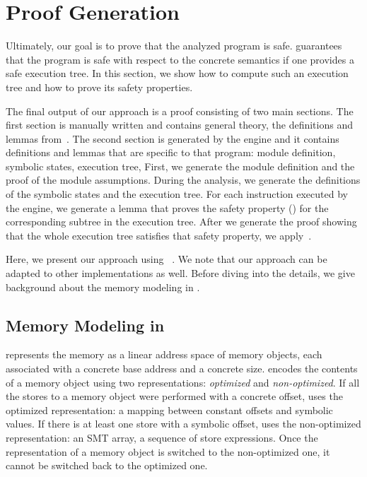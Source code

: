 \section{Proof Generation}
\label{sec:proof-generation}

Ultimately, our goal is to prove that the analyzed program is safe.
 guarantees that the program is safe with respect to the concrete semantics if one provides a safe execution tree.
In this section, we show how to compute such an execution tree and how to prove its safety properties.

The final output of our approach is a \coq proof consisting of two main sections.
%
The first section is manually written and contains general theory,
\ie the definitions and lemmas from~.
%
The second section is generated by the \SE engine and it contains definitions and lemmas that are specific to that program:
module definition, symbolic states, execution tree, \etc
First, we generate the module definition and the proof of the module assumptions.
During the analysis,
we generate the definitions of the symbolic states and the execution tree.
For each instruction executed by the \SE engine,
we generate a lemma that proves the safety property () for the corresponding subtree in the execution tree.
After we generate the proof showing that the whole execution tree satisfies that safety property, we apply~.

Here, we present our approach using \klee~\cite{klee}. %
We note that our approach can be adapted to other \SE implementations as well.
Before diving into the details,
we give background about the memory modeling in \klee.

\subsection{Memory Modeling in \klee}

\klee represents the memory as a linear address space of memory objects,
each associated with a concrete base address and a concrete size.
\klee encodes the contents of a memory object using two representations: \emph{optimized} and \emph{non-optimized}.
If all the stores to a memory object were performed with a concrete offset,
\klee uses the optimized representation:
a mapping between constant offsets and symbolic values.
If there is at least one store with a symbolic offset,
\klee uses the non-optimized representation:
an SMT array, \ie a sequence of store expressions.
Once the representation of a memory object is switched to the non-optimized one, it cannot be switched back to the optimized one.

